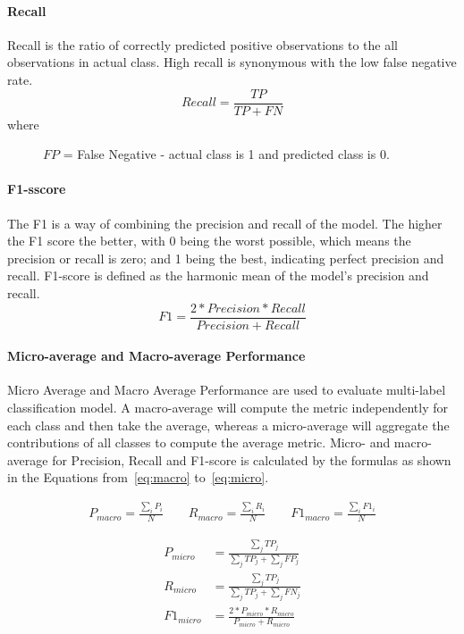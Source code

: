 \paragraph{Recall}
Recall is the ratio of correctly predicted positive observations to the all observations in actual class.
High recall is synonymous with the low false negative rate.
\begin{equation}
Recall = \frac{TP}{TP+FN}
\end{equation}
where
\begin{description}
\item[] \(FP\) = False Negative - actual class is 1 and predicted class is 0.
\end{description}
\paragraph{F1-sscore}
The F1 is a way of combining the precision and recall of the model. The higher the F1 score the better, with 0 being the worst possible, which means the precision or recall is zero; and 1 being the best, indicating perfect precision and recall.
F1-score is defined as the harmonic mean of the model's precision and recall.
\begin{equation}
F1 = \frac{2*Precision*Recall}{Precision+Recall}
\end{equation}


\paragraph{Micro-average and Macro-average Performance}
Micro Average and Macro Average Performance are used to evaluate multi-label classification model. A macro-average will compute the metric independently for each class and then take the average, whereas a micro-average will aggregate the contributions of all classes to compute the average metric.
Micro- and macro-average for Precision, Recall and F1-score is calculated by the formulas as shown in the Equations from~\ref{eq:macro} to~\ref{eq:micro}.

\begin{align}
    P_{macro} = \frac{\sum_{i} P_{i}}{N}
    \,\,\,\,\,\,\,\,\,\,\,\,
    R_{macro} = \frac{\sum_{i} R_{i}}{N}
    \,\,\,\,\,\,\,\,\,\,\,\,
    F1_{macro} = \frac{\sum_{i} F1_{i}}{N}
    \label{eq:macro}
\end{align}

\begin{align}
    P_{micro} &= \frac{\sum_{j}^{} TP_{j}}{\sum_{j} TP_{j}+\sum_{j} FP_{j}} \\
    R_{micro} &= \frac{\sum_{j}^{} TP_{j}}{\sum_{j} TP_{j}+\sum_{j} FN_{j}} \\
    F1_{micro} &= \frac{2*P_{micro}*R_{micro}}{P_{micro}+R_{micro}}
    \label{eq:micro}
\end{align}

